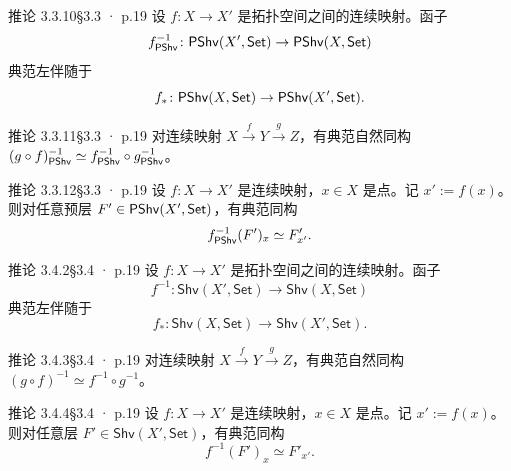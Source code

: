 \documentclass[UTF8,10pt,fontset=windows]{ctexart}
\newcommand{\Set}{\mathsf{Set}}\newcommand{\Ab}{\mathsf{Ab}}
\newcommand{\Shv}{\mathsf{Shv}}\newcommand{\Mod}{\mathsf{Mod}}
\begin{document}
\begin{card}{推论 3.3.10}{§3.3 · p.19}
设 $f\colon X\to X'$ 是拓扑空间之间的连续映射。函子
\[
f_{\PShv}^{-1}\colon\PShv(X',\Set)\to\PShv(X,\Set)
\]
典范左伴随于
\[
f_*\colon\PShv(X,\Set)\to\PShv(X',\Set).
\]
\end{card}
\begin{card}{推论 3.3.11}{§3.3 · p.19}
对连续映射 $X\xrightarrow{\ f\ }Y\xrightarrow{\ g\ }Z$，有典范自然同构 $(g\circ f)_{\mathsf{PShv}}^{-1}\simeq f_{\mathsf{PShv}}^{-1}\circ g_{\mathsf{PShv}}^{-1}$。
\end{card}
\begin{card}{推论 3.3.12}{§3.3 · p.19}
设 $f\colon X\to X'$ 是连续映射，$x\in X$ 是点。记 $x':=f(x)$。则对任意预层 $F'\in\PShv(X',\Set)$，有典范同构
\[
f_{\mathsf{PShv}}^{-1}(F')_x\simeq F'_{x'}.
\]
\end{card}
\begin{card}{推论 3.4.2}{§3.4 · p.19}
设 $f\colon X\to X'$ 是拓扑空间之间的连续映射。函子
\[
f^{-1}\colon\Shv(X',\Set)\to\Shv(X,\Set)
\]
典范左伴随于
\[
f_*\colon\Shv(X,\Set)\to\Shv(X',\Set).
\]
\end{card}
\begin{card}{推论 3.4.3}{§3.4 · p.19}
对连续映射 $X\xrightarrow{\ f\ }Y\xrightarrow{\ g\ }Z$，有典范自然同构 $(g\circ f)^{-1}\simeq f^{-1}\circ g^{-1}$。
\end{card}
\begin{card}{推论 3.4.4}{§3.4 · p.19}
设 $f\colon X\to X'$ 是连续映射，$x\in X$ 是点。记 $x':=f(x)$。则对任意层 $F'\in\Shv(X',\Set)$，有典范同构
\[
f^{-1}(F')_x\simeq F'_{x'}.
\]
\end{card}
\end{document}
